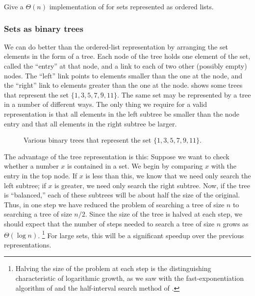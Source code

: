 \begin{exercise}
	\label{Exercise 2.62}
	Give a \( Θ(n) \) implementation of  for sets represented as ordered lists.
\end{exercise}



\subsubsection*{Sets as binary trees}

We can do better than the ordered-list representation by arranging the set elements in the form of a tree.
Each node of the tree holds one element of the set, called the “entry” at that node, and a link to each of two other (possibly empty) nodes.
The “left” link points to elements smaller than the one at the node, and the “right” link to elements greater than the one at the node.
 shows some trees that represent the set \( \{ 1, 3, 5, 7, 9, 11 \} \).
The same set may be represented by a tree in a number of different ways.
The only thing we require for a valid representation is that all elements in the left subtree be smaller than the node entry and that all elements in the right subtree be larger.

\begin{figure}[tb]
	\centering
	
	\caption{
		Various binary trees that represent the set \( \{ 1, 3, 5, 7, 9, 11 \} \).
	}
	\label{Figure 2.16}
\end{figure}

The advantage of the tree representation is this:
Suppose we want to check whether a number \( x \) is contained in a set.
We begin by comparing \( x \) with the entry in the top node.
If \( x \) is less than this, we know that we need only search the left subtree;
if \( x \) is greater, we need only search the right subtree.
Now, if the tree is “balanced,” each of these subtrees will be about half the size of the original.
Thus, in one step we have reduced the problem of searching a tree of size \( n \) to searching a tree of size \( n / 2 \).
Since the size of the tree is halved at each step, we should expect that the number of steps needed to search a tree of size \( n \) grows as \( Θ(\log n) \).%
\footnote{
	Halving the size of the problem at each step is the distinguishing characteristic of logarithmic growth, as we saw with the fast-exponentiation algorithm of  and the half-interval search method of .
}
For large sets, this will be a significant speedup over the previous representations.

